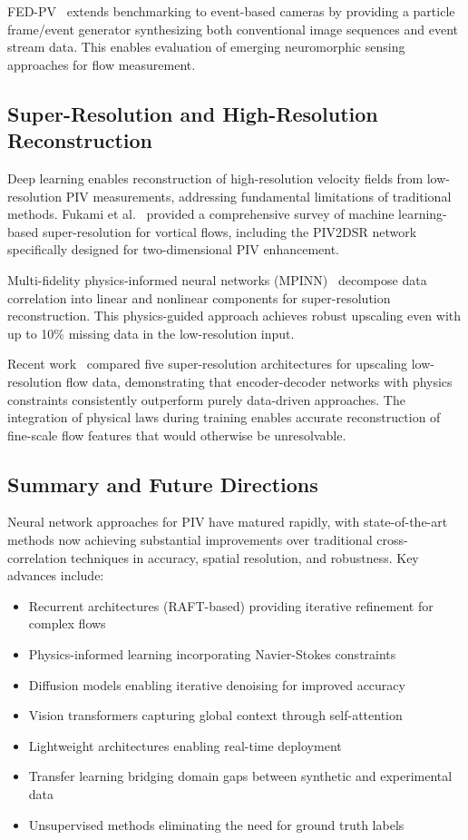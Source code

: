FED-PV~\cite{fed_pv2024} extends benchmarking to event-based cameras by providing a particle frame/event generator synthesizing both conventional image sequences and event stream data. This enables evaluation of emerging neuromorphic sensing approaches for flow measurement.

\subsection{Super-Resolution and High-Resolution Reconstruction}

Deep learning enables reconstruction of high-resolution velocity fields from low-resolution PIV measurements, addressing fundamental limitations of traditional methods. Fukami et al.~\cite{fukami2023superres} provided a comprehensive survey of machine learning-based super-resolution for vortical flows, including the PIV2DSR network specifically designed for two-dimensional PIV enhancement.

Multi-fidelity physics-informed neural networks (MPINN)~\cite{mpinn2024} decompose data correlation into linear and nonlinear components for super-resolution reconstruction. This physics-guided approach achieves robust upscaling even with up to 10\% missing data in the low-resolution input.

Recent work~\cite{hou2024superres_comparison} compared five super-resolution architectures for upscaling low-resolution flow data, demonstrating that encoder-decoder networks with physics constraints consistently outperform purely data-driven approaches. The integration of physical laws during training enables accurate reconstruction of fine-scale flow features that would otherwise be unresolvable.

\subsection{Summary and Future Directions}

Neural network approaches for PIV have matured rapidly, with state-of-the-art methods now achieving substantial improvements over traditional cross-correlation techniques in accuracy, spatial resolution, and robustness. Key advances include:

\begin{itemize}
\item Recurrent architectures (RAFT-based) providing iterative refinement for complex flows
\item Physics-informed learning incorporating Navier-Stokes constraints
\item Diffusion models enabling iterative denoising for improved accuracy
\item Vision transformers capturing global context through self-attention
\item Lightweight architectures enabling real-time deployment
\item Transfer learning bridging domain gaps between synthetic and experimental data
\item Unsupervised methods eliminating the need for ground truth labels
\end{itemize}

